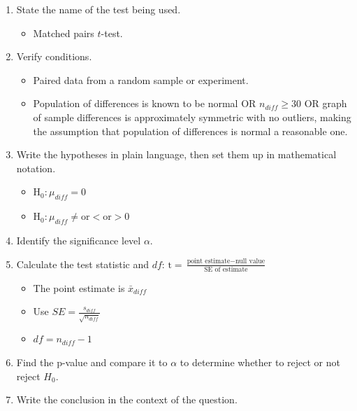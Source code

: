 \textA{\newpage}

\begin{termBox}{
\begin{enumerate}
\setlength{\itemsep}{0mm}
\item State the name of the test being used.\vspace{-1.5mm}
\begin{itemize}
\setlength{\itemsep}{0mm}
\item Matched pairs $t$-test.
\end{itemize}
\item Verify conditions.\vspace{-1.5mm}
\begin{itemize}
\setlength{\itemsep}{0mm}
\item Paired data from a random sample or experiment.
\item Population of differences is known to be normal OR $n_{diff}\ge 30$ OR graph of sample differences is approximately symmetric with no outliers, making the assumption that population of differences is normal a reasonable one.
\end{itemize}
\item Write the hypotheses in plain language, then set them up in mathematical notation.\vspace{-1.5mm}
\begin{itemize}
\setlength{\itemsep}{0mm}
\item H$_0: \mu_{diff}=0$
\item H$_0: \mu_{diff} \ne \text{or} < \text{or} > 0$
\end{itemize}
\item Identify the significance level $\alpha$.
\item Calculate the test statistic and $df$: $\text{t} = \frac{\text{point estimate} - \text{null value}}{\text{SE of estimate}}$
\begin{itemize}
\setlength{\itemsep}{0mm}
\item The point estimate is $\bar{x}_{diff}$
\item Use $SE = \frac{s_{diff}}{\sqrt{n_{diff}}}$
\item $df=n_{diff}-1$
\end{itemize}
\item Find the p-value and compare it to $\alpha$ to determine whether to reject or not reject $H_0$.
\item Write the conclusion in the context of the question.
\end{enumerate}}
\end{termBox}

